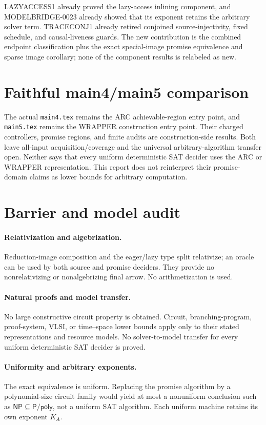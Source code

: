 \documentclass[11pt]{article}
\begin{document}
LAZYACCESS1 already proved the lazy-access inlining component, and
MODELBRIDGE-0023 already showed that its exponent retains the arbitrary solver
term.  TRACECONJ1 already retired conjoined source-injectivity, fixed schedule,
and causal-liveness guards.  The new contribution is the combined endpoint
classification plus the exact special-image promise equivalence and sparse
image corollary; none of the component results is relabeled as new.

\section*{Faithful main4/main5 comparison}
The actual \texttt{main4.tex} remains the ARC achievable-region entry point,
and \texttt{main5.tex} remains the WRAPPER construction entry point.  Their
charged controllers, promise regions, and finite audits are construction-side
results.  Both leave all-input acquisition/coverage and the universal
arbitrary-algorithm transfer open.  Neither says that every uniform
deterministic SAT decider uses the ARC or WRAPPER representation.  This report
does not reinterpret their promise-domain claims as lower bounds for arbitrary
computation.

\section*{Barrier and model audit}
\paragraph{Relativization and algebrization.}
Reduction-image composition and the eager/lazy type split relativize; an
oracle can be used by both source and promise deciders.  They provide no
nonrelativizing or nonalgebrizing final arrow.  No arithmetization is used.

\paragraph{Natural proofs and model transfer.}
No large constructive circuit property is obtained.  Circuit,
branching-program, proof-system, VLSI, or time--space lower bounds apply only
to their stated representations and resource models.  No solver-to-model
transfer for every uniform deterministic SAT decider is proved.

\paragraph{Uniformity and arbitrary exponents.}
The exact equivalence is uniform.  Replacing the promise algorithm by a
polynomial-size circuit family would yield at most a nonuniform conclusion
such as $\mathsf{NP}\subseteq\mathsf{P}/\mathsf{poly}$, not a uniform SAT
algorithm.  Each uniform machine retains its own exponent $K_A$.
\end{document}
